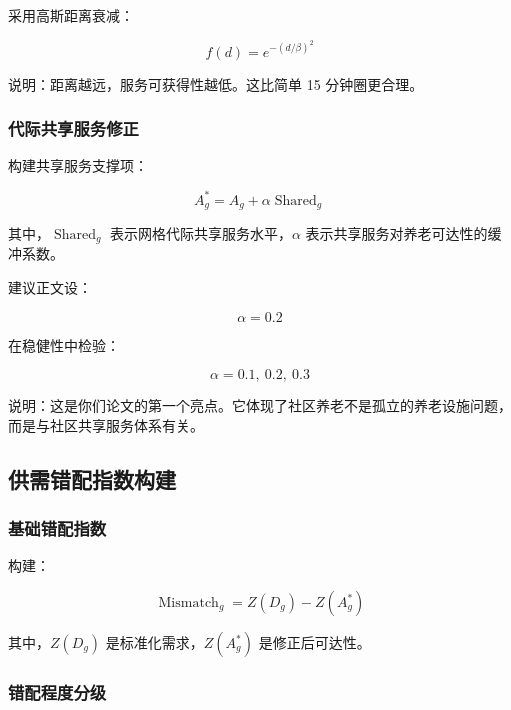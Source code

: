 \documentclass[UTF8,zihao=-4,a4paper,fontset=none]{ctexart}
\begin{document}
采用高斯距离衰减：

\begin{equation}
f(d)=e^{-(d/\beta)^2}
\end{equation}

说明：距离越远，服务可获得性越低。这比简单 15 分钟圈更合理。

\subsubsection{代际共享服务修正}

构建共享服务支撑项：

\begin{equation}
A_g^{*}=A_g+\alpha \operatorname{Shared}_g
\end{equation}

其中，$\operatorname{Shared}_g$ 表示网格代际共享服务水平，$\alpha$ 表示共享服务对养老可达性的缓冲系数。

建议正文设：

\begin{equation}
\alpha = 0.2
\end{equation}

在稳健性中检验：

\begin{equation}
\alpha = 0.1,\ 0.2,\ 0.3
\end{equation}

说明：这是你们论文的第一个亮点。它体现了社区养老不是孤立的养老设施问题，而是与社区共享服务体系有关。

\subsection{供需错配指数构建}

\subsubsection{基础错配指数}

构建：

\begin{equation}
\operatorname{Mismatch}_g = Z(D_g) - Z(A_g^{*})
\end{equation}

其中，$Z(D_g)$ 是标准化需求，$Z(A_g^{*})$ 是修正后可达性。

\subsubsection{错配程度分级}
\end{document}
